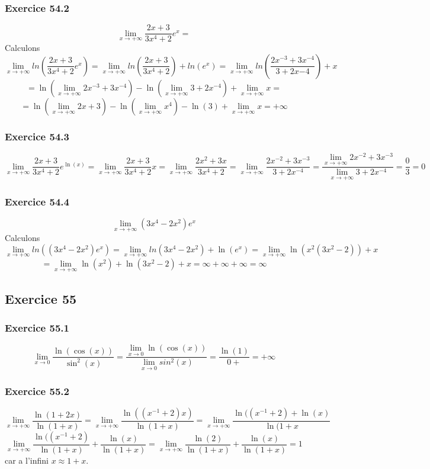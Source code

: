 \documentclass[]{book}
\theoremstyle{definition}
\begin{document}
\subsubsection*{Exercice 54.2}
$$\lim_{x\to+\infty}\frac{2x+3}{3x^4+2}e^x = $$
Calculons 
$$\lim_{x\to+\infty}ln\left(\frac{2x+3}{3x^4+2}e^x\right) = \lim_{x\to+\infty}ln\left(\frac{2x+3}{3x^4+2}\right)+ln(e^x) = \lim_{x\to+\infty}ln\left(\frac{2x^{-3}+3x^{-4}}{3+2x{-4}}\right)+x $$
$$ = \ln(\lim_{x\to+\infty}2x^{-3}+3x^{-4})-\ln(\lim_{x\to+\infty}3+2x^{-4})+ \lim_{x\to+\infty}x = $$
$$ = \ln(\lim_{x\to+\infty}2x+3)-\ln(\lim_{x\to+\infty}x^{4})-\ln(3)+ \lim_{x\to+\infty}x = +\infty$$


\subsubsection*{Exercice 54.3}
$$\lim_{x\to+\infty}\frac{2x+3}{3x^4+2}e^{\ln(x)} = \lim_{x\to+\infty}\frac{2x+3}{3x^4+2}x = \lim_{x\to+\infty}\frac{2x^2+3x}{3x^4+2} = \lim_{x\to+\infty}\frac{2x^{-2}+3x^{-3}}{3+2x^{-4}} = \frac{\lim_{x\to+\infty}2x^{-2}+3x^{-3}}{\lim_{x\to+\infty}3+2x^{-4}} = \frac{0}{3} = 0$$

\subsubsection*{Exercice 54.4}
$$\lim_{x\to+\infty}(3x^4-2x^2)e^x$$
Calculons 
$$\lim_{x\to+\infty}ln((3x^4-2x^2)e^x) = \lim_{x\to+\infty}ln(3x^4-2x^2)+\ln(e^x) = \lim_{x\to+\infty}\ln(x^2(3x^2-2))+x $$
$$ = \lim_{x\to+\infty}\ln(x^2) +\ln(3x^2-2)+x = \infty + \infty + \infty = \infty$$


\subsection*{Exercice 55}
\subsubsection*{Exercice 55.1}
$$\lim_{x\to 0}\frac{\ln(\cos(x))}{\sin^2(x)} = \frac{\lim_{x\to 0}\ln(\cos(x))}{\lim_{x\to 0}sin^2(x)} = \frac{\ln(1)}{0+} = +\infty$$

\subsubsection*{Exercice 55.2}
$$\lim_{x\to+\infty}\frac{\ln(1+2x)}{\ln(1+x)} = \lim_{x\to+\infty}\frac{\ln((x^{-1}+2)x)}{\ln(1+x)} = \lim_{x\to+\infty}\frac{\ln((x^{-1}+2)+\ln(x)}{\ln(1+x}$$
$$\lim_{x\to+\infty}\frac{\ln((x^{-1}+2)}{\ln(1+x)} + \frac{\ln(x)}{\ln(1+x)} = \lim_{x\to+\infty}\frac{\ln(2)}{\ln(1+x)} + \frac{\ln(x)}{\ln(1+x)} = 1$$
car a l'infini $x \approx 1+x$.\\
\end{document}
